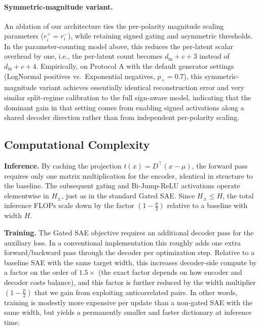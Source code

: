 \documentclass{article}
\begin{document}
\paragraph{Symmetric-magnitude variant.}
An ablation of our architecture ties the per-polarity magnitude scaling parameters ($r_i^+=r_i^-$), while retaining signed gating and asymmetric thresholds. In the parameter-counting model above, this reduces the per-latent scalar overhead by one, i.e., the per-latent count becomes $d_{\text{in}} + c + 3$ instead of $d_{\text{in}} + c + 4$.
Empirically, on Protocol A with the default generator settings (LogNormal positives vs.\ Exponential negatives, $p_+=0.7$), this symmetric-magnitude variant achieves essentially identical reconstruction error and very similar split-regime calibration to the full sign-aware model, indicating that the dominant gain in that setting comes from enabling signed activations along a shared decoder direction rather than from independent per-polarity scaling.

\subsection{Computational Complexity}

\textbf{Inference.} By caching the projection $t(x) = D^\top (x - \mu)$, the forward pass requires only one matrix multiplication for the encoder, identical in structure to the baseline. The subsequent gating and Bi-Jump-ReLU activations operate elementwise in $H_{\pm}$, just as in the standard Gated SAE. Since $H_{\pm} \le H$, the total inference FLOPs scale down by the factor $\left(1 - \frac{p}{2}\right)$ relative to a baseline with width $H$.

\textbf{Training.} The Gated SAE objective requires an additional decoder pass for the auxiliary loss. In a conventional implementation this roughly adds one extra forward/backward pass through the decoder per optimization step. Relative to a baseline SAE with the same target width, this increases decoder-side compute by a factor on the order of $1.5\times$ (the exact factor depends on how encoder and decoder costs balance), and this factor is further reduced by the width multiplier $\left(1 - \frac{p}{2}\right)$ that we gain from exploiting anticorrelated pairs. In other words, training is modestly more expensive per update than a non-gated SAE with the same width, but yields a permanently smaller and faster dictionary at inference time.

\end{document}
